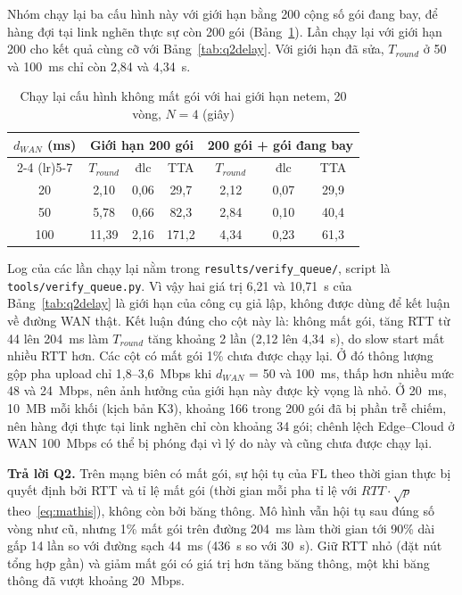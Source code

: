 Nhóm chạy lại ba cấu hình này với giới hạn bằng 200 cộng số gói đang bay, để hàng đợi tại link nghẽn thực sự còn 200 gói (Bảng~\ref{tab:qverify}). Lần chạy lại với giới hạn 200 cho kết quả cùng cỡ với Bảng~\ref{tab:q2delay}. Với giới hạn đã sửa, $T_{round}$ ở 50 và 100~ms chỉ còn 2{,}84 và 4{,}34~s.

\begin{table}[H]
    \centering
    \caption{Chạy lại cấu hình không mất gói với hai giới hạn netem, 20 vòng, $N = 4$ (giây)}
    \label{tab:qverify}
    \begin{tabular}{c c c c c c c}
        \toprule
        \multirow{2}{*}{$d_{WAN}$ (ms)} & \multicolumn{3}{c}{\textbf{Giới hạn 200 gói}} & \multicolumn{3}{c}{\textbf{200 gói + gói đang bay}} \\
        \cmidrule(lr){2-4} \cmidrule(lr){5-7}
        & $T_{round}$ & đlc & TTA & $T_{round}$ & đlc & TTA \\
        \midrule
        20 & 2,10 & 0,06 & 29,7 & 2,12 & 0,07 & 29,9 \\
        50 & 5,78 & 0,66 & 82,3 & 2,84 & 0,10 & 40,4 \\
        100 & 11,39 & 2,16 & 171,2 & 4,34 & 0,23 & 61,3 \\
        \bottomrule
    \end{tabular}
\end{table}

Log của các lần chạy lại nằm trong \nolinkurl{results/verify_queue/}, script là \nolinkurl{tools/verify_queue.py}. Vì vậy hai giá trị 6{,}21 và 10{,}71~s của Bảng~\ref{tab:q2delay} là giới hạn của công cụ giả lập, không được dùng để kết luận về đường WAN thật. Kết luận đúng cho cột này là: không mất gói, tăng RTT từ 44 lên 204~ms làm $T_{round}$ tăng khoảng 2 lần (2{,}12 lên 4{,}34~s), do slow start mất nhiều RTT hơn. Các cột có mất gói 1\% chưa được chạy lại. Ở đó thông lượng gộp pha upload chỉ 1{,}8--3{,}6~Mbps khi $d_{WAN}$ = 50 và 100~ms, thấp hơn nhiều mức 48 và 24~Mbps, nên ảnh hưởng của giới hạn này được kỳ vọng là nhỏ. Ở 20~ms, 10~MB mỗi khối (kịch bản K3), khoảng 166 trong 200 gói đã bị phần trễ chiếm, nên hàng đợi thực tại link nghẽn chỉ còn khoảng 34 gói; chênh lệch Edge--Cloud ở WAN 100~Mbps có thể bị phóng đại vì lý do này và cũng chưa được chạy lại.

\textbf{Trả lời Q2.} Trên mạng biên có mất gói, sự hội tụ của FL theo thời gian thực bị quyết định bởi RTT và tỉ lệ mất gói (thời gian mỗi pha tỉ lệ với $RTT \cdot \sqrt{p}$ theo~\eqref{eq:mathis}), không còn bởi băng thông. Mô hình vẫn hội tụ sau đúng số vòng như cũ, nhưng 1\% mất gói trên đường 204~ms làm thời gian tới 90\% dài gấp 14 lần so với đường sạch 44~ms (436~s so với 30~s). Giữ RTT nhỏ (đặt nút tổng hợp gần) và giảm mất gói có giá trị hơn tăng băng thông, một khi băng thông đã vượt khoảng 20~Mbps.

